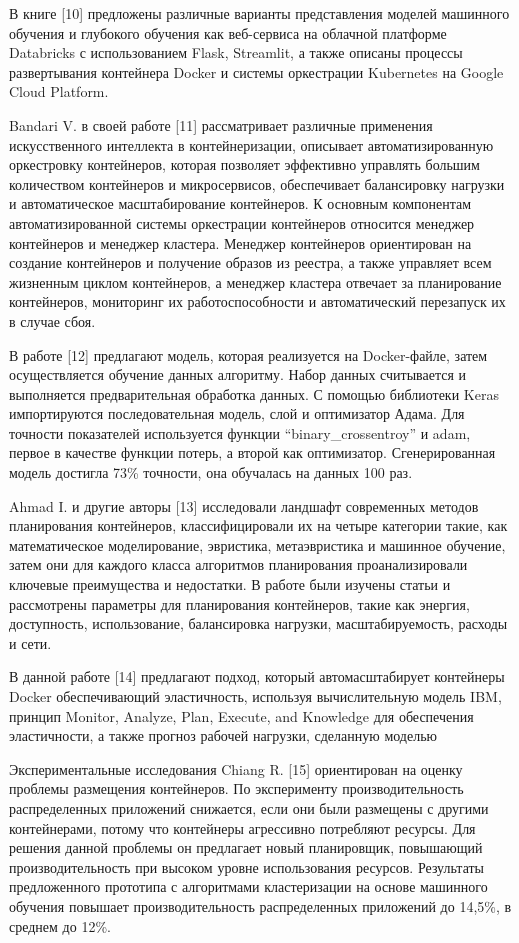 В книге {[}10{]} предложены различные варианты представления моделей
машинного обучения и глубокого обучения как веб-сервиса на облачной
платформе Databricks с использованием Flask, Streamlit, а также описаны
процессы развертывания контейнера Docker и системы оркестрации
Kubernetes на Google Cloud Platform.

Bandari V. в своей работе {[}11{]} рассматривает различные применения
искусственного интеллекта в контейнеризации, описывает
автоматизированную оркестровку контейнеров, которая позволяет эффективно
управлять большим количеством контейнеров и микросервисов, обеспечивает
балансировку нагрузки и автоматическое масштабирование контейнеров. К
основным компонентам автоматизированной системы оркестрации контейнеров
относится менеджер контейнеров и менеджер кластера. Менеджер контейнеров
ориентирован на создание контейнеров и получение образов из реестра, а
также управляет всем жизненным циклом контейнеров, а менеджер кластера
отвечает за планирование контейнеров, мониторинг их работоспособности и
автоматический перезапуск их в случае сбоя.

В работе {[}12{]} предлагают модель, которая реализуется на
Docker-файле, затем осуществляется обучение данных алгоритму. Набор
данных считывается и выполняется предварительная обработка данных. С
помощью библиотеки Keras импортируются последовательная модель, слой и
оптимизатор Адама. Для точности показателей используется функции
``binary\_crossentroy'' и adam, первое в качестве функции потерь, а
второй как оптимизатор. Сгенерированная модель достигла 73\% точности,
она обучалась на данных 100 раз.

Ahmad I. и другие авторы {[}13{]} исследовали ландшафт современных
методов планирования контейнеров, классифицировали их на четыре
категории такие, как математическое моделирование, эвристика,
метаэвристика и машинное обучение, затем они для каждого класса
алгоритмов планирования проанализировали ключевые преимущества и
недостатки. В работе были изучены статьи и рассмотрены параметры для
планирования контейнеров, такие как энергия, доступность, использование,
балансировка нагрузки, масштабируемость, расходы и сети.

В данной работе {[}14{]} предлагают подход, который автомасштабирует
контейнеры Docker обеспечивающий эластичность, используя вычислительную
модель IBM, принцип Monitor, Analyze, Plan, Execute, and Knowledge для
обеспечения эластичности, а также прогноз рабочей нагрузки, сделанную
моделью

Экспериментальные исследования Chiang R. {[}15{]} ориентирован на оценку
проблемы размещения контейнеров. По эксперименту производительность
распределенных приложений снижается, если они были размещены с другими
контейнерами, потому что контейнеры агрессивно потребляют ресурсы. Для
решения данной проблемы он предлагает новый планировщик, повышающий
производительность при высоком уровне использования ресурсов. Результаты
предложенного прототипа с алгоритмами кластеризации на основе машинного
обучения повышает производительность распределенных приложений до
14,5\%, в среднем до 12\%.

